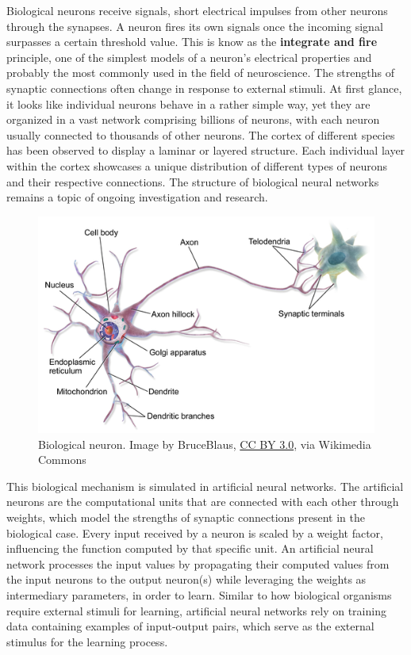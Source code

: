 Biological neurons receive signals, short electrical impulses from other neurons through the synapses. A neuron fires its own signals once the incoming signal surpasses a certain threshold value. This is know as the \textbf{integrate and fire} principle, one of the simplest models of a neuron’s electrical properties and probably the most commonly used in the field of neuroscience. The strengths of synaptic connections often change in response to external stimuli. At first glance, it looks like individual neurons behave in a rather simple way, yet they are organized in a vast network comprising billions of neurons, with each neuron usually connected to thousands of other neurons. The cortex of different species has been observed to display a laminar or layered structure. Each individual layer within the cortex showcases a unique distribution of different types of neurons and their respective connections. The structure of biological neural networks remains a topic of ongoing investigation and research.

\begin{figure}
    \centering
    \includegraphics[width=0.7\linewidth]{img/img-ch1/Blausen_0657_MultipolarNeuron.png}
    \caption{Biological neuron. Image by BruceBlaus, \href{https://creativecommons.org/licenses/by/3.0}{CC BY 3.0}, via Wikimedia Commons}
    \label{fig:bio-neuron}
\end{figure}


This biological mechanism is simulated in artificial neural networks. The artificial neurons are the computational units that are connected with each other through weights, which model the strengths of synaptic connections present in the biological case. Every input received by a neuron is scaled by a weight factor, influencing the function computed by that specific unit. An artificial neural network processes the input values by propagating their computed values from the input neurons to the output neuron(s) while leveraging the weights as intermediary parameters, in order to learn. Similar to how biological organisms require external stimuli for learning, artificial neural networks rely on training data containing examples of input-output pairs, which serve as the external stimulus for the learning process. 

